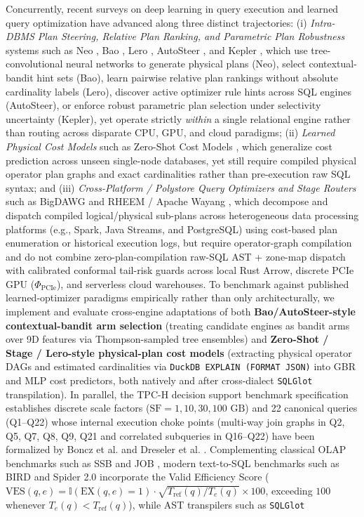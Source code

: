 \documentclass[10pt,a4paper]{article}
\begin{document}
Concurrently, recent surveys on deep learning in query execution \cite{milicevic2024dlquery} and learned query optimization have advanced along three distinct trajectories: (i) \emph{Intra-DBMS Plan Steering, Relative Plan Ranking, and Parametric Plan Robustness} systems such as Neo \cite{marcus2019neo}, Bao \cite{marcus2021bao}, Lero \cite{zhu2023lero}, AutoSteer \cite{anneser2023autosteer}, and Kepler \cite{doshi2023kepler}, which use tree-convolutional neural networks to generate physical plans (Neo), select contextual-bandit hint sets (Bao), learn pairwise relative plan rankings without absolute cardinality labels (Lero), discover active optimizer rule hints across SQL engines (AutoSteer), or enforce robust parametric plan selection under selectivity uncertainty (Kepler), yet operate strictly \emph{within} a single relational engine rather than routing across disparate CPU, GPU, and cloud paradigms; (ii) \emph{Learned Physical Cost Models} such as Zero-Shot Cost Models \cite{hilprecht2022zeroshot}, which generalize cost prediction across unseen single-node databases, yet still require compiled physical operator plan graphs and exact cardinalities rather than pre-execution raw SQL syntax; and (iii) \emph{Cross-Platform / Polystore Query Optimizers and Stage Routers} such as BigDAWG \cite{tan2023stage} and RHEEM / Apache Wayang \cite{gupta2023adaptive}, which decompose and dispatch compiled logical/physical sub-plans across heterogeneous data processing platforms (e.g., Spark, Java Streams, and PostgreSQL) using cost-based plan enumeration or historical execution logs, but require operator-graph compilation and do not combine zero-plan-compilation raw-SQL AST + zone-map dispatch with calibrated conformal tail-risk guards across local Rust Arrow, discrete PCIe GPU ($\Phi_{\text{PCIe}}$), and serverless cloud warehouses. To benchmark against published learned-optimizer paradigms empirically rather than only architecturally, we implement and evaluate cross-engine adaptations of both \textbf{Bao/AutoSteer-style contextual-bandit arm selection} (treating candidate engines as bandit arms over 9D features via Thompson-sampled tree ensembles) and \textbf{Zero-Shot / Stage / Lero-style physical-plan cost models} (extracting physical operator DAGs and estimated cardinalities via \texttt{DuckDB EXPLAIN (FORMAT JSON)} into GBR and MLP cost predictors, both natively and after cross-dialect \texttt{SQLGlot} transpilation). In parallel, the TPC-H decision support benchmark specification \cite{tpc2022tpch} establishes discrete scale factors ($\text{SF}=1, 10, 30, 100\text{ GB}$) and 22 canonical queries (Q1--Q22) whose internal execution choke points (multi-way join graphs in Q2, Q5, Q7, Q8, Q9, Q21 and correlated subqueries in Q16--Q22) have been formalized by Boncz et al. \cite{boncz2014tpch} and Dreseler et al. \cite{dreseler2020quantifying}. Complementing classical OLAP benchmarks such as SSB \cite{oneil2009ssb} and JOB \cite{leis2015job}, modern text-to-SQL benchmarks such as BIRD \cite{li2023bird} and Spider 2.0 \cite{lei2025spider2} incorporate the Valid Efficiency Score ($\text{VES}(q,e) = \mathbb{I}(\text{EX}(q,e)=1)\cdot\sqrt{T_{\text{ref}}(q)/T_e(q)}\times 100$, exceeding $100$ whenever $T_e(q) < T_{\text{ref}}(q)$), while AST transpilers such as \texttt{SQLGlot} 
\end{document}
